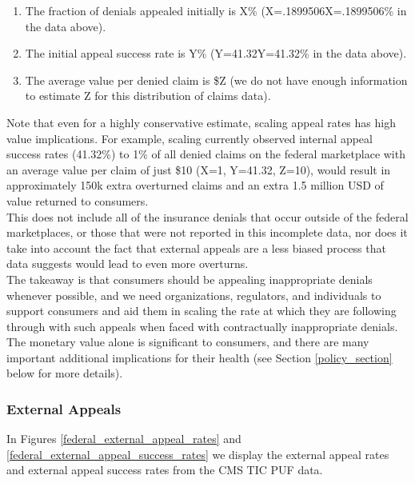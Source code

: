 \documentclass[12pt, a4paper]{report}
\begin{document}
\begin{enumerate}
\item The fraction of denials appealed initially is X\% (X=.1899506X=.1899506\% in the data above).
\item The initial appeal success rate is Y\% (Y=41.32Y=41.32\% in the data above).
\item The average value per denied claim is \$Z (we do not have enough information to estimate Z for this distribution of claims data).
\end{enumerate}

Note that even for a highly conservative estimate, scaling appeal rates has high value implications. For example, scaling currently observed internal appeal success rates (41.32\%) to 1\% of all denied claims on the federal marketplace with an average value per claim of just \$10 (X=1, Y=41.32, Z=10), would result in approximately 150k extra overturned claims and an extra 1.5 million USD of value returned to consumers.\\

This does not include all of the insurance denials that occur outside of the federal marketplaces, or those that were not reported in this incomplete data, nor does it take into account the fact that external appeals are a less biased process that data suggests would lead to even more overturns.\\

The takeaway is that consumers should be appealing inappropriate denials whenever possible, and we need organizations, regulators, and individuals to support consumers and aid them in scaling the rate at which they are following through with such appeals when faced with contractually inappropriate denials.\\

The monetary value alone is significant to consumers, and there are many important additional implications for their health (see Section \ref{policy_section} below for more details).\\


\subsubsection{External Appeals}

In Figures \ref{federal_external_appeal_rates} and \ref{federal_external_appeal_success_rates} we display the external appeal rates and external appeal success rates from the CMS TIC PUF data.\\
\end{document}
